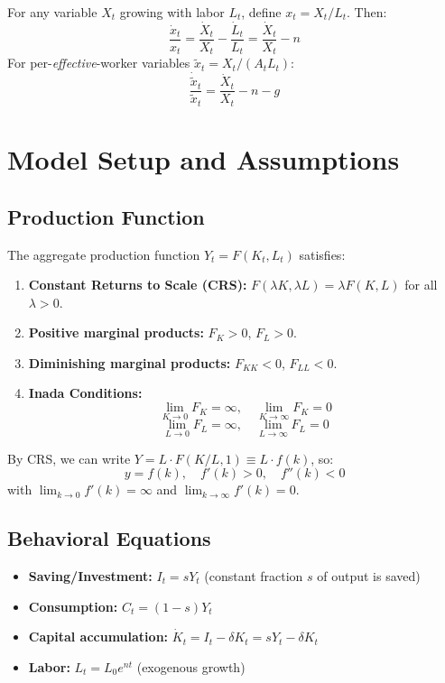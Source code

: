 \documentclass[a4paper,11pt]{article}
\begin{document}
\begin{keyformulabox}
For any variable $X_t$ growing with labor $L_t$, define $x_t = X_t/L_t$. Then:
\[
\frac{\dot{x}_t}{x_t} = \frac{\dot{X}_t}{X_t} - \frac{\dot{L}_t}{L_t} = \frac{\dot{X}_t}{X_t} - n
\]
For per-\emph{effective}-worker variables $\tilde{x}_t = X_t/(A_t L_t)$:
\[
\frac{\dot{\tilde{x}}_t}{\tilde{x}_t} = \frac{\dot{X}_t}{X_t} - n - g
\]
\end{keyformulabox}

\section{Model Setup and Assumptions}

\subsection*{Production Function}

The aggregate production function $Y_t = F(K_t, L_t)$ satisfies:

\begin{enumerate}[label=\textbf{A\arabic*.}]
    \item \textbf{Constant Returns to Scale (CRS):} $F(\lambda K, \lambda L) = \lambda F(K,L)$ for all $\lambda > 0$.
    \item \textbf{Positive marginal products:} $F_K > 0$, $F_L > 0$.
    \item \textbf{Diminishing marginal products:} $F_{KK} < 0$, $F_{LL} < 0$.
    \item \textbf{Inada Conditions:}
    \[
    \lim_{K \to 0} F_K = \infty, \quad \lim_{K \to \infty} F_K = 0
    \]
    \[
    \lim_{L \to 0} F_L = \infty, \quad \lim_{L \to \infty} F_L = 0
    \]
\end{enumerate}

By CRS, we can write $Y = L \cdot F(K/L, 1) \equiv L \cdot f(k)$, so:
\[
y = f(k), \quad f'(k) > 0, \quad f''(k) < 0
\]
with $\lim_{k\to 0} f'(k)=\infty$ and $\lim_{k\to\infty} f'(k)=0$.

\subsection*{Behavioral Equations}

\begin{itemize}
    \item \textbf{Saving/Investment:} $I_t = s Y_t$ (constant fraction $s$ of output is saved)
    \item \textbf{Consumption:} $C_t = (1-s)Y_t$
    \item \textbf{Capital accumulation:} $\dot{K}_t = I_t - \delta K_t = s Y_t - \delta K_t$
    \item \textbf{Labor:} $L_t = L_0 e^{nt}$ (exogenous growth)
\end{itemize}
\end{document}
